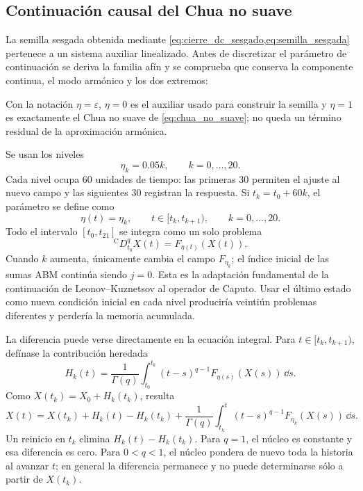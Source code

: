 \subsection{Continuación causal del Chua no suave}
\label{sec:continuacion_causal}

La semilla sesgada obtenida mediante
\cref{eq:cierre_dc_sesgado,eq:semilla_sesgada} pertenece a un sistema
auxiliar linealizado. Antes de discretizar el parámetro de continuación se
deriva la familia afín y se comprueba que conserva la componente continua, el
modo armónico y los dos extremos:
\begingroup
\def\HAFOderivationpart{10}

\endgroup

Con la notación \(\eta=\varepsilon\),
\(\eta=0\) es el auxiliar usado para construir la semilla y \(\eta=1\) es
exactamente el Chua no suave de \cref{eq:chua_no_suave}; no queda un término
residual de la aproximación armónica.

Se usan los niveles
\begin{equation}
\eta_k=0.05k,\qquad k=0,\ldots,20.
\label{eq:niveles_eta}
\end{equation}
Cada nivel ocupa \(60\) unidades de tiempo: las primeras \(30\) permiten el
ajuste al nuevo campo y las siguientes \(30\) registran la respuesta. Si
\(t_k=t_0+60k\), el parámetro se define como
\begin{equation}
\eta(t)=\eta_k,
\qquad t\in[t_k,t_{k+1}),\qquad k=0,\ldots,20.
\label{eq:eta_tiempo}
\end{equation}
Todo el intervalo \([t_0,t_{21}]\) se integra como un solo problema
\begin{equation}
{}^{\mathrm C}D_{t_0}^{q}X(t)=F_{\eta(t)}(X(t)).
\label{eq:continuacion_unica_historia}
\end{equation}
Cuando \(k\) aumenta, únicamente cambia el campo \(F_{\eta_k}\); el índice
inicial de las sumas ABM continúa siendo \(j=0\). Esta es la adaptación
fundamental de la continuación de Leonov--Kuznetsov al operador de Caputo.
Usar el último estado como nueva condición inicial en cada nivel produciría
veintiún problemas diferentes y perdería la memoria acumulada.

La diferencia puede verse directamente en la ecuación integral. Para
\(t\in[t_k,t_{k+1})\), defínase la contribución heredada
\[
 H_k(t)=\frac1{\Gamma(q)}\int_{t_0}^{t_k}
 (t-s)^{q-1}F_{\eta(s)}(X(s))\,\dd s.
\]
Como \(X(t_k)=X_0+H_k(t_k)\), resulta
\begin{equation}
 X(t)=X(t_k)+H_k(t)-H_k(t_k)
 +\frac1{\Gamma(q)}\int_{t_k}^{t}(t-s)^{q-1}
                 F_{\eta_k}(X(s))\,\dd s.
 \label{eq:continuacion_memoria_heredada}
\end{equation}
Un reinicio en \(t_k\) elimina \(H_k(t)-H_k(t_k)\). Para \(q=1\), el
núcleo es constante y esa diferencia es cero. Para \(0<q<1\), el núcleo
pondera de nuevo toda la historia al avanzar \(t\); en general la diferencia
permanece y no puede determinarse sólo a partir de \(X(t_k)\).

